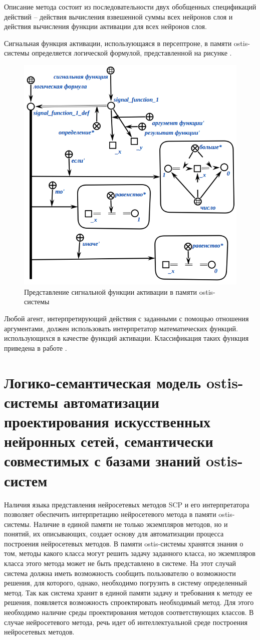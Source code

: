 Описание метода состоит из последовательности двух обобщенных спецификаций действий -- действия вычисления взвешенной суммы всех нейронов слоя и действия вычисления функции активации для всех нейронов слоя.

Сигнальная функция активации, использующаяся в персептроне, в памяти ostis-системы определяется логической формулой, представленной на рисунке .

\begin{figure}
	\centering
	\includegraphics[width=0.5\linewidth]{author/part3/figures/signal_function_def.png}
	\caption{Представление сигнальной функции активации в памяти ostis-системы}
	\label{fig:signal_function_def}
\end{figure}

Любой агент, интерпретирующий действия с заданными с помощью отношения  аргументами, должен использовать интерпретатор математических функций. использующихся в качестве функций активации. Классификация таких функция приведена в работе .


\section{Логико-семантическая модель ostis-системы автоматизации проектирования искусственных нейронных сетей, семантически совместимых с базами знаний ostis-систем}
\label{sec_chapter_ann_framework}

Наличия языка представления нейросетевых методов SCP и его интерпретатора позволяет обеспечить интерпретацию нейросетевого метода в памяти ostis-системы. Наличие в единой памяти не только экземпляров методов, но и понятий, их описывающих, создает основу для автоматизации процесса построения нейросетевых методов. В памяти ostis-системы хранятся знания о том, методы какого класса могут решить задачу заданного класса, но экземпляров класса этого метода может не быть представлено в системе. На этот случай система должна иметь возможность сообщить пользователю о возможности решения, для которого, однако, необходимо погрузить в систему определенный метод. Так как система хранит в единой памяти задачу и требования к методу ее решения, появляется возможность спроектировать необходимый метод. Для этого необходимо наличие среды проектирования методов соответствующих классов. В случае нейросетевого метода, речь идет об интеллектуальной среде построения нейросетевых методов.

